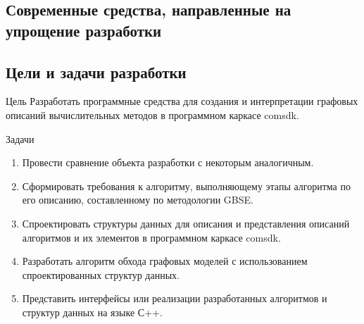 \subsection{Современные средства, направленные на упрощение разработки}
\begin{frame}



\end{frame}

\subsection{Цели и задачи разработки}
\begin{frame}

  \begin{block}{Цель}
    Разработать программные средства для создания и интерпретации графовых описаний вычислительных методов в программном каркасе comsdk.
  \end{block}

  \begin{block}{Задачи}
    \begin{enumerate}
      \item Провести сравнение объекта разработки с некоторым аналогичным.
      \item Сформировать требования к алгоритму, выполняющему этапы алгоритма по его описанию, составленному по методологии GBSE.
      \item Спроектировать структуры данных для описания и представления описаний алгоритмов и их элементов в программном каркасе comsdk.
      \item Разработать алгоритм обхода графовых моделей с использованием спроектированных структур данных.
      \item Представить интерфейсы или реализации разработанных алгоритмов и структур данных на языке С++.
    \end{enumerate}
  \end{block}

\end{frame}


